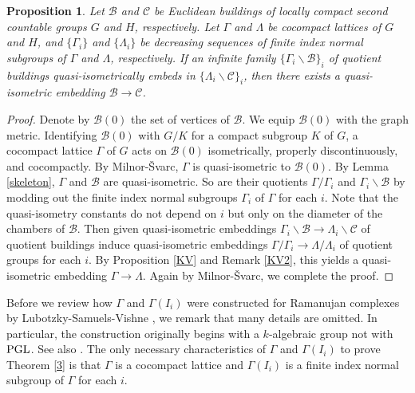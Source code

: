 \documentclass[letterpaper, reqno, 11pt]{amsart}
\newtheorem{prop}[theorem]{Proposition}
\theoremstyle{definition}
\theoremstyle{definition}
\theoremstyle{remark}
\newcommand{\Ga}{\Gamma}
\newcommand{\La}{\Lambda}
\newcommand{\cal}{\mathcal}
\begin{document}
\begin{prop}\label{2}
    Let $\cal{B}$ and $\cal{C}$ be Euclidean buildings of locally compact second countable groups $G$ and $H$, respectively. 
    Let $\Ga$ and $\La$ be cocompact lattices of $G$ and $H$, and $\{\Ga_i\}$ and 
    $\{\La_i\}$ be decreasing sequences of finite index normal subgroups of $\Ga$ and $\La$, respectively. 
    If an infinite family $\{ \Ga_i\backslash \cal{B} \}_i$ of quotient buildings quasi-isometrically embeds in $\{ \La_i\backslash \cal{C} \}_i$,
    then there exists a quasi-isometric embedding $\cal{B} \to \cal{C}$.
\end{prop} 

\begin{proof} 
    Denote by $\cal{B}(0)$ the set of vertices of $\cal{B}$.
    We equip $\cal{B}(0)$ with the graph metric.
    Identifying $\cal{B}(0)$ with $G/K$ for a compact subgroup $K$ of $G$, a cocompact lattice $\Ga$ of $G$ acts on $\cal{B}(0)$ isometrically, properly discontinuously, and cocompactly. By Milnor-Švarc, $\Ga$ is quasi-isometric to $\cal{B}(0)$. By Lemma \ref{skeleton},  $\Ga$ and $\cal{B}$ are quasi-isometric.
    So are their quotients $\Ga /\Ga_i$ and $ \Ga_i \backslash \cal{B}$ by modding out the finite index normal subgroups $\Ga_i$ of $\Ga$ for each $i$. 
    Note that the quasi-isometry constants do not depend on $i$ but only on the diameter of the chambers of $\cal{B}$.
    Then given quasi-isometric embeddings
    $ \Ga_i \backslash \cal{B} \to
   \La_i \backslash \cal{C}$ of quotient
    buildings induce quasi-isometric embeddings
    $\Ga/ \Ga_i \to \La /\La_i$ of quotient groups for each $i$.
    By Proposition \ref{KV} and Remark \ref{KV2}, this yields a quasi-isometric embedding $\Ga \to \La$. Again by Milnor-Švarc, we complete the proof.
\end{proof}


 Before we review how $\Ga$ and $\Ga(I_i)$
 were constructed for Ramanujan complexes by Lubotzky-Samuels-Vishne \cite{lubotzky2005explicit}, we remark that many details are omitted. 
 In particular, the construction originally begins with a $k$-algebraic group not with $\rm{PGL}$.
 See also \cite{lubotzky2014ramanujan}.
 The only necessary characteristics of $\Ga$ and $\Ga(I_i)$ to prove Theorem \ref{3} is that $\Ga$ is a cocompact lattice and $\Ga(I_i)$ is a finite index normal subgroup of $\Ga$ for each $i$.
\end{document}
